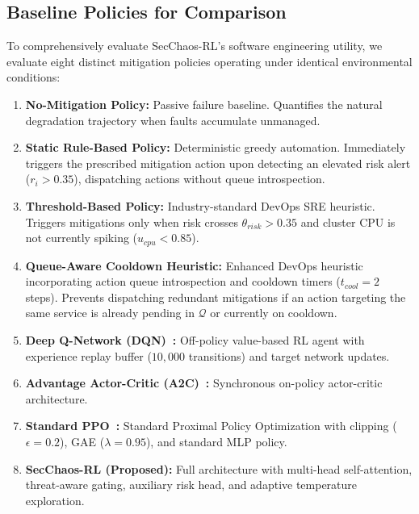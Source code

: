 \documentclass[ASNA,twocolumn]{USG}
\begin{document}
\subsection{Baseline Policies for Comparison}
To comprehensively evaluate SecChaos-RL's software engineering utility, we evaluate eight distinct mitigation policies operating under identical environmental conditions:
\begin{enumerate}
    \item \textbf{No-Mitigation Policy:} Passive failure baseline. Quantifies the natural degradation trajectory when faults accumulate unmanaged.
    \item \textbf{Static Rule-Based Policy:} Deterministic greedy automation. Immediately triggers the prescribed mitigation action upon detecting an elevated risk alert ($r_i > 0.35$), dispatching actions without queue introspection.
    \item \textbf{Threshold-Based Policy:} Industry-standard DevOps SRE heuristic. Triggers mitigations only when risk crosses $\theta_{risk} > 0.35$ and cluster CPU is not currently spiking ($u_{cpu} < 0.85$).
    \item \textbf{Queue-Aware Cooldown Heuristic:} Enhanced DevOps heuristic incorporating action queue introspection and cooldown timers ($t_{cool} = 2$ steps). Prevents dispatching redundant mitigations if an action targeting the same service is already pending in $\mathcal{Q}$ or currently on cooldown.
    \item \textbf{Deep Q-Network (DQN)~\cite{mnih2015human}:} Off-policy value-based RL agent with experience replay buffer ($10,000$ transitions) and target network updates.
    \item \textbf{Advantage Actor-Critic (A2C)~\cite{mnih2016asynchronous}:} Synchronous on-policy actor-critic architecture.
    \item \textbf{Standard PPO~\cite{schulman2017ppo}:} Standard Proximal Policy Optimization with clipping ($\epsilon = 0.2$), GAE ($\lambda = 0.95$), and standard MLP policy.
    \item \textbf{SecChaos-RL (Proposed):} Full architecture with multi-head self-attention, threat-aware gating, auxiliary risk head, and adaptive temperature exploration.
\end{enumerate}
\end{document}
